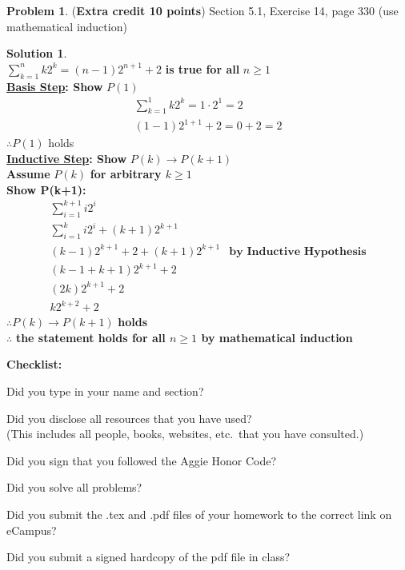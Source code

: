 \documentclass{article}
\theoremstyle{definition}
\newtheorem{problem}{Problem}
\newtheorem*{solution}{Solution}
\newcommand{\checklist}{\noindent\textbf{Checklist:}
\begin{compactitem}[$\Box$] 
\item Did you type in your name and section? 
\item Did you disclose all resources that you have used? \\
(This includes all people, books, websites, etc.\ that you have consulted.)
\item Did you sign that you followed the Aggie Honor Code? 
\item Did you solve all problems? 
\item Did you submit the .tex and .pdf files of your homework to the correct link on eCampus?
\item Did you submit a signed hardcopy of the pdf file in class? 
\end{compactitem}
}
\begin{document}
\begin{problem} (\textbf{Extra credit 10 points})
Section 5.1, Exercise 14, page 330 (use mathematical induction)
\end{problem}
\begin{solution} \ \\
$\displaystyle\sum_{k=1}^{n}k 2^k = (n-1)2^{n+1}+2$ \textbf{is true for all} $n \ge 1 $ \\
\textbf{\underline{Basis Step}: Show } $P(1)$ \\
\begin{align*}
  \displaystyle\sum_{k=1}^{1}k 2^k  = 1\cdot 2^1 = 2\\
  (1-1)2^{1+1}+2 = 0 + 2 = 2
\end{align*}
$\therefore P(1)$ holds \\
\textbf{\underline{Inductive Step}: Show } $P(k) \rightarrow P(k+1)$ \\
\textbf{Assume} $P(k)$ \textbf{for arbitrary $k \ge 1 $} \\
\textbf{Show P(k+1):} \\
\begin{align*}
  \displaystyle\sum_{i=1}^{k+1}i 2^i \\
  \displaystyle\sum_{i=1}^{k}i 2^i + (k+1)2^{k+1}\\
  (k-1)2^{k+1} + 2 + (k+1)2^{k+1} &\textbf{by Inductive Hypothesis} \\
  (k-1 + k + 1)2^{k+1} + 2 \\
  (2k)2^{k+1} + 2 \\
  k2^{k+2} + 2
\end{align*}
$\therefore P(k) \rightarrow P(k+1)$ \textbf{holds}\\
$\therefore$ \textbf{the statement holds for all $n \ge 1 $ by mathematical induction}
\end{solution}

\goodbreak
\checklist
\end{document}
